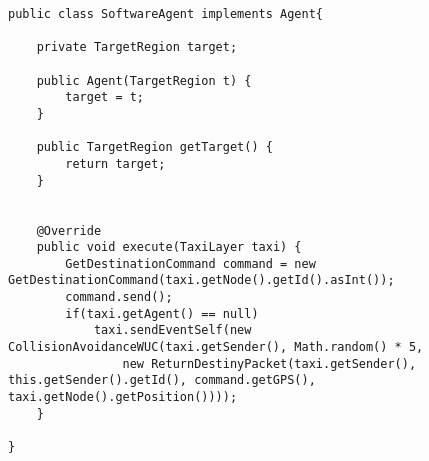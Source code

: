 \begin{lstlisting}



public class SoftwareAgent implements Agent{
	
	private TargetRegion target;
	
	public Agent(TargetRegion t) {
		target = t;
	}
	
	public TargetRegion getTarget() {
		return target;
	}


	@Override
	public void execute(TaxiLayer taxi) {
		GetDestinationCommand command = new GetDestinationCommand(taxi.getNode().getId().asInt());
		command.send();
		if(taxi.getAgent() == null)
			taxi.sendEventSelf(new CollisionAvoidanceWUC(taxi.getSender(), Math.random() * 5,
				new ReturnDestinyPacket(taxi.getSender(), this.getSender().getId(), command.getGPS(), taxi.getNode().getPosition())));
	}		
	
}
\end{lstlisting}
